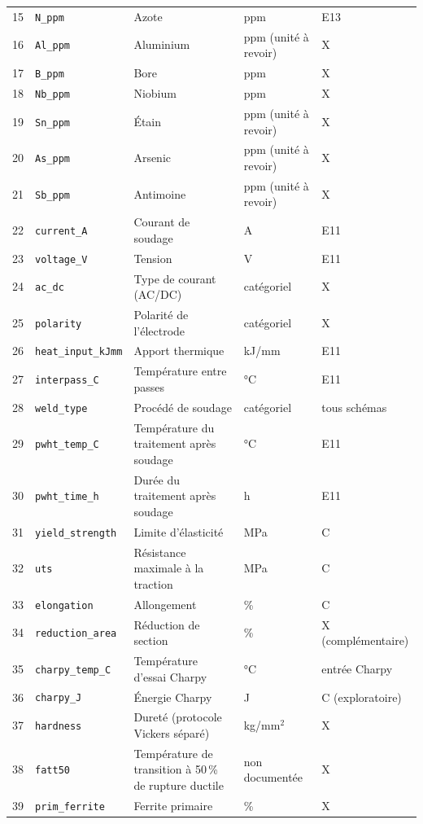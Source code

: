 {\begin{longtable}{@{}r l >{\raggedright\arraybackslash}p{4.7cm} >{\raggedright\arraybackslash}p{2.6cm} >{\raggedright\arraybackslash}p{2.4cm}@{}}
15 & \texttt{N\_ppm}  & Azote     & ppm & E13 \\
16 & \texttt{Al\_ppm} & Aluminium & ppm (unité à revoir) & X \\
17 & \texttt{B\_ppm}  & Bore      & ppm & X \\
18 & \texttt{Nb\_ppm} & Niobium   & ppm & X \\
19 & \texttt{Sn\_ppm} & Étain     & ppm (unité à revoir) & X \\
20 & \texttt{As\_ppm} & Arsenic   & ppm (unité à revoir) & X \\
21 & \texttt{Sb\_ppm} & Antimoine & ppm (unité à revoir) & X \\
22 & \texttt{current\_A} & Courant de soudage & A & E11 \\
23 & \texttt{voltage\_V} & Tension            & V & E11 \\
24 & \texttt{ac\_dc}     & Type de courant (AC/DC) & catégoriel & X \\
25 & \texttt{polarity}  & Polarité de l'électrode & catégoriel & X \\
26 & \texttt{heat\_input\_kJmm} & Apport thermique & kJ/mm & E11 \\
27 & \texttt{interpass\_C} & Température entre passes & °C & E11 \\
28 & \texttt{weld\_type} & Procédé de soudage & catégoriel & tous schémas \\
29 & \texttt{pwht\_temp\_C} & Température du traitement après soudage & °C & E11 \\
30 & \texttt{pwht\_time\_h} & Durée du traitement après soudage & h & E11 \\
31 & \texttt{yield\_strength} & Limite d'élasticité & MPa & C \\
32 & \texttt{uts} & Résistance maximale à la traction & MPa & C \\
33 & \texttt{elongation} & Allongement & \% & C \\
34 & \texttt{reduction\_area} & Réduction de section & \% & X (complémentaire) \\
35 & \texttt{charpy\_temp\_C} & Température d'essai Charpy & °C & entrée Charpy \\
36 & \texttt{charpy\_J} & Énergie Charpy & J & C (exploratoire) \\
37 & \texttt{hardness} & Dureté (protocole Vickers séparé) & kg/mm$^2$ & X \\
38 & \texttt{fatt50} & Température de transition à 50\,\% de rupture ductile & non documentée & X \\
39 & \texttt{prim\_ferrite} & Ferrite primaire & \% & X \\

\end{longtable}}
